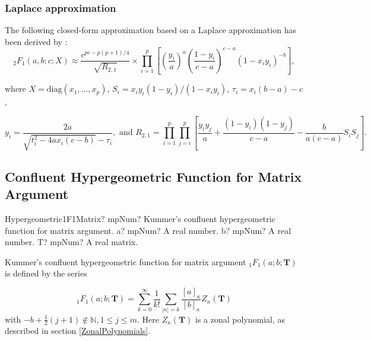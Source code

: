 \subsubsection{Laplace approximation}
The following closed-form approximation based on a Laplace approximation has been derived by \cite{Butler_Wood_2002}:
\begin{equation}
	{}_2{F}_1(a,b;c;X)  \approx \frac{c^{pc-p(p+1)/4}}{\sqrt{R_{2,1}}}   \times \prod_{i=1}^p \left[\left(\frac{y_i}{a}\right)^a \left(\frac{1-y_i}{c-a} \right)^{c-a} (1-x_i y_i)^{-b}  \right],
\end{equation}
\begin{center}
	where $X=\text{diag}(x_1,\ldots,x_p)$, $S_i = x_i y_i (1-y_i)/(1-x_i y_i)$, $\tau_i = x_i(b-a)-c$,
\end{center}
\begin{equation*}
	y_i=\frac{2a}{\sqrt{t_i^2 - 4ax_i(c-b)}-\tau_i}, \text{ and } R_{2,1} = \prod_{i=1}^p  \prod_{j=i}^p \left[\frac{y_i y_j}{a}+\frac{(1-y_i)(1-y_j)}{c-a}-\frac{b}{a(c-a)} S_i S_j   \right]. 
\end{equation*}












\newpage
\subsection{Confluent Hypergeometric Function for Matrix Argument}
\label{Hypergeometric1F1Matrix}


\begin{mpFunctionsExtract}
	\mpFunctionThreeNotImplemented
	{Hypergeometric1F1Matrix? mpNum? Kummer's confluent hypergeometric function  for matrix argument.}
	{a? mpNum? A real number.}
	{b? mpNum? A real number.}	
	{T? mpNum? A real matrix.}	
\end{mpFunctionsExtract}


\vspace{0.3cm}
Kummer's confluent hypergeometric function  for matrix argument ${}_1F_1(a;b;\textbf{T})$ is defined by the series \citep{NIST}

\begin{equation}
	{}_1F_1(a;b;\textbf{T}) = \sum_{k=0}^\infty \frac{1}{k!}  \sum_{|\kappa|=k}  \frac{\left[a\right]_{\kappa}}{\left[b\right]_{\kappa}} Z_{\kappa}(\textbf{T})
\end{equation}
with $-b+\tfrac{1}{2}(j+1) \notin  \mathbb{N}, 1 \leq j \leq m$. Here $Z_{\kappa}(\textbf{T})$ is a zonal polynomial, as described in section \ref{ZonalPolynomials}.


